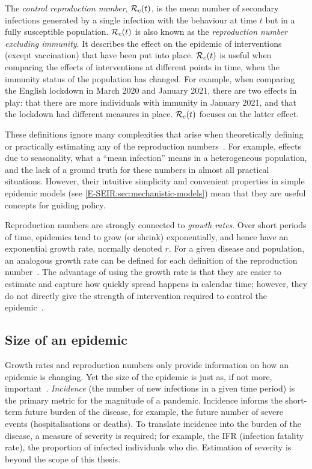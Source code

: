 \documentclass[thesis.tex]{subfiles}
\begin{document}
The \emph{control reproduction number}, $\mathcal{R}_{c}(t)$, is the mean number of secondary infections generated by a single infection with the behaviour at time $t$ but in a fully susceptible population.
$\mathcal{R}_{c}(t)$ is also known as the \emph{reproduction number excluding immunity}.
It describes the effect on the epidemic of interventions (except vaccination) that have been put into place.
$\mathcal{R}_{c}(t)$ is useful when comparing the effects of interventions at different points in time, when the immunity status of the population has changed.
For example, when comparing the English lockdown in March 2020 and January 2021, there are two effects in play: that there are more individuals with immunity in January 2021, and that the lockdown had different measures in place.
$\mathcal{R}_{c}(t)$ focuses on the latter effect.

These definitions ignore many complexities that arise when theoretically defining or practically estimating any of the reproduction numbers~\autocite{pellisEstimation}.
For example, effects due to seasonality, what a ``mean infection'' means in a heterogeneous population, and the lack of a ground truth for these numbers in almost all practical situations.
However, their intuitive simplicity and convenient properties in simple epidemic models (see \cref{E-SEIR:sec:mechanistic-models}) mean that they are useful concepts for guiding policy.

Reproduction numbers are strongly connected to \emph{growth rates}.
Over short periods of time, epidemics tend to grow (or shrink) exponentially, and hence have an exponential growth rate, normally denoted $r$.
For a given disease and population, an analogous growth rate can be defined for each definition of the reproduction number~\autocite{pellisEstimation,paragGrowthRates,wallingaGI}.
The advantage of using the growth rate is that they are easier to estimate and capture how quickly spread happens in calendar time; however, they do not directly give the strength of intervention required to control the epidemic~\autocite{royalSocietyRnumber}.

\subsection{Size of an epidemic}

Growth rates and reproduction numbers only provide information on how an epidemic is changing.
Yet the size of the epidemic is just as, if not more, important~\autocite{pellisEstimation}.
\emph{Incidence} (the number of new infections in a given time period) is the primary metric for the magnitude of a pandemic.
Incidence informs the short-term future burden of the disease, for example, the future number of severe events (hospitalisations or deaths).
To translate incidence into the burden of the disease, a measure of severity is required; for example, the IFR (infection fatality rate), the proportion of infected individuals who die.
Estimation of severity is beyond the scope of this thesis.
\end{document}
